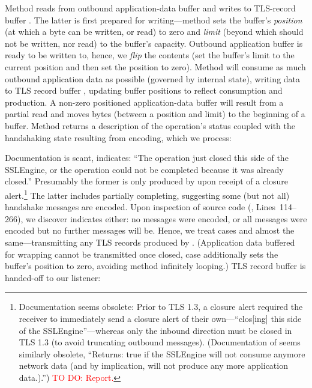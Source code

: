 \noindent
Method  reads from outbound application-data buffer 
and writes to TLS-record buffer . The latter is first 
prepared for writing---method  sets the buffer's \emph{position} 
(at which a byte can be written, or read) to zero and \emph{limit} (beyond which should 
not be written, nor read) to the buffer's capacity. Outbound application buffer 
 is ready to be written to, hence, we \emph{flip} the contents (set 
the buffer's limit to the current position and then set the position to zero). 
Method  will consume as much outbound application data as possible 
(governed by internal state), writing data to TLS record buffer , 
updating buffer positions to reflect consumption and production. A non-zero positioned 
application-data buffer will result from a partial read and  moves bytes 
(between a position and limit) to the beginning of a buffer. 
Method  returns a description of the operation's status coupled 
with the handshaking state resulting from encoding, which we process:



\noindent
Documentation is scant,  indicates: ``The operation just closed this 
side of the SSLEngine, or the operation could not be completed because it was 
already closed.'' Presumably the former is only produced by  
upon receipt of a closure alert.\footnote{%
  Documentation seems obsolete: Prior to TLS 1.3, a closure alert required the 
  receiver to immediately send a closure alert of their own---``clos[ing] this 
  side of the SSLEngine''---whereas only the inbound direction must be closed 
  in TLS 1.3 (to avoid truncating outbound messages). (Documentation of   
   seems similarly obsolete, ``Returns: true if the 
  SSLEngine will not consume anymore network data (and by implication, will not 
  produce any more application data.).'')
  \ifImplNotes \textcolor{red}{TO DO: Report.} \fi
}
The latter includes  partially completing, suggesting some 
(but not all) handshake messages are encoded. 
Upon inspection of source code (, Lines~114--266), we 
discover  indicates either: no messages were encoded, or all messages 
were encoded but no further messages will be. Hence, we treat cases  and
 almost the same---transmitting any TLS records produced by . 
(Application data buffered for wrapping cannot be transmitted once closed, 
case  additionally sets the buffer's position to zero, avoiding method 
 infinitely looping.)
TLS record buffer  is handed-off to our listener:

